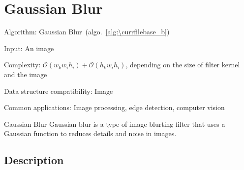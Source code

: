 \documentclass[catalog.tex]{subfiles}
\begin{document}
\def\pbname{Gaussian Blur} %

\section{\pbname} 

\begin{overview}
\item [Algorithm:] Gaussian Blur~(algo.~\ref{alg:\currfilebase_b}) 
\item [Input:] An image
\item [Complexity:]$\mathcal{O}(w_kw_ih_i)+\mathcal{O}(h_kw_ih_i)$, depending on the size of filter kernel and the image
\item [Data structure compatibility:] Image
\item [Common applications:] Image processing, edge detection, computer vision
\end{overview}


\begin{problem}{\pbname}
	Gaussian blur is a type of image blurting filter that uses a Gaussian function to reduces details and noise in images.
\end{problem}


\subsection*{Description}
\end{document}
